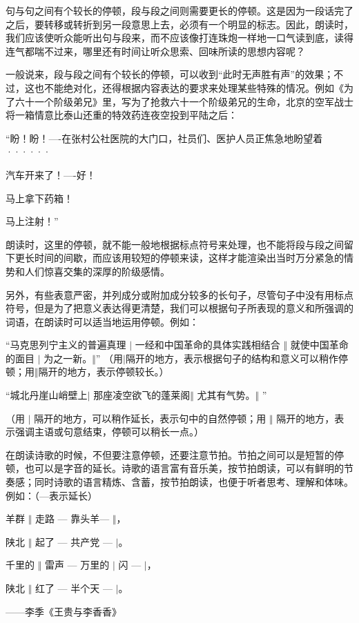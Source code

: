 句与句之间有个较长的停顿，段与段之间则需要更长的停顿。这是因为一段话完了之后，要转移或转折到另一段意思上去，必须有一个明显的标志。因此，朗读时，我们应该使听众能听出句与段来，而不应该像打连珠炮一样地一口气读到底，读得连气都喘不过来，哪里还有时间让听众思索、回味所读的思想内容呢？

一般说来，段与段之间有个较长的停顿，可以收到“此时无声胜有声”的效果；不过，这也不能绝对化，还得根据内容表达的要求来处理某些特殊的情况。例如《为了六十一个阶级弟兄》里，写为了抢救六十一个阶级弟兄的生命，北京的空军战士将一箱情意比泰山还重的特效药连夜空投到平陆之后：

“盼！盼！----在张村公社医院的大门口，社员们、医护人员正焦急地盼望着······

汽车开来了！----好！

马上拿下药箱！

马上注射！”

朗读时，这里的停顿，就不能一般地根据标点符号来处理，也不能将段与段之间留下更长时间的间歇，而应该用较短的停顿来读，这样才能渲染出当时万分紧急的情势和人们惊喜交集的深厚的阶级感情。

另外，有些表意严密，并列成分或附加成分较多的长句子，尽管句子中没有用标点符号，但是为了把意义表达得更清楚，我们可以根据句子所表现的意义和所强调的词语，在朗读时可以适当地运用停顿。例如：

“马克思列宁主义的普遍真理 $\vert$ 
一经和中国革命的具体实践相结合 $\Vert$ 
就使中国革命的面目 $\vert$ 
为之一新。$\Vert$”
（用$\vert$隔开的地方，表示根据句子的结构和意义可以稍作停顿；用$\Vert$隔开的地方，表示停顿较长。）

“城北丹崖山峭壁上$\vert$ 
那座凌空欲飞的蓬莱阁$\Vert$ 
尤其有气势。$\Vert$ ”

（用 $\vert$ 
隔开的地方，可以稍作延长，表示句中的自然停顿；用 $\Vert$ 
隔开的地方，表示强调主语或句意结束，停顿可以稍长一点。）

在朗读诗歌的时候，不但要注意停顿，还要注意节拍。节拍之间可以是短暂的停顿，也可以是字音的延长。诗歌的语言富有音乐美，按节拍朗读，可以有鲜明的节奏感；同时诗歌的语言精炼、含蓄，按节拍朗读，也便于听者思考、理解和体味。例如：（---表示延长）

羊群 $\Vert$ 走路 --- 靠头羊--- $\Vert$，

陕北 $\Vert$ 起了 --- 共产党 --- $\vert$。

千里的 $\Vert$ 雷声 --- 万里的 $\vert$ 闪 --- $\vert$，

陕北 $\Vert$ 红了 --- 半个天 --- $\vert$。
\begin{flushright}
——李季《王贵与李香香》
\end{flushright}

